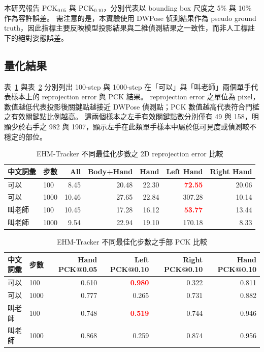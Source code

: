 \documentclass[class=NCU_thesis, crop=false]{standalone}
\providecommand{\metricmark}[1]{\textcolor{red}{\textbf{#1}}}
\begin{document}
本研究報告 $\mathrm{PCK}_{0.05}$ 與 $\mathrm{PCK}_{0.10}$，分別代表以 bounding box 尺度之 5\% 與 10\% 作為容許誤差。
需注意的是，本實驗使用 DWPose 偵測結果作為 pseudo ground truth，因此指標主要反映模型投影結果與二維偵測結果之一致性，而非人工標註下的絕對姿態誤差。

\subsection{量化結果}

表~\ref{tab:tracking_step_reprojection} 與表~\ref{tab:tracking_step_pck} 分別列出 100-step 與 1000-step 在「可以」與「叫老師」兩個單手代表樣本上的 reprojection error 與 PCK 結果。
reprojection error 之單位為 pixel，數值越低代表投影後關鍵點越接近 DWPose 偵測點；PCK 數值越高代表符合門檻之有效關鍵點比例越高。
這兩個樣本之左手有效關鍵點數分別僅有 49 與 158，明顯少於右手之 982 與 1907，顯示左手在此類單手樣本中屬於低可見度或偵測較不穩定的部位。

\begin{table}[H]
\centering
\caption{EHM-Tracker 不同最佳化步數之 2D reprojection error 比較}
\label{tab:tracking_step_reprojection}
\begin{tabular}{llrrrrr}
\toprule
中文詞彙 & 步數 & All & Body+Hand & Hand & Left Hand & Right Hand \\
\midrule
可以 & 100  & 8.45 & 20.48 & 22.30 & \metricmark{72.55} & 20.06 \\
可以 & 1000 & 10.46 & 27.65 & 22.84 & 307.28 & 10.14 \\
叫老師 & 100  & 10.45 & 17.28 & 16.12 & \metricmark{53.77} & 13.44 \\
叫老師 & 1000 & 9.54 & 22.94 & 19.10 & 170.18 & 8.33 \\
\bottomrule
\end{tabular}
\end{table}

\begin{table}[H]
\centering
\caption{EHM-Tracker 不同最佳化步數之手部 PCK 比較}
\label{tab:tracking_step_pck}
\begin{tabular}{llrrrr}
\toprule
中文詞彙 & 步數 & Hand PCK@0.05 & Left PCK@0.10 & Right PCK@0.10 & Hand PCK@0.10 \\
\midrule
可以 & 100  & 0.610 & \metricmark{0.980} & 0.322 & 0.811 \\
可以 & 1000 & 0.777 & 0.265 & 0.731 & 0.882 \\
叫老師 & 100  & 0.748 & \metricmark{0.519} & 0.744 & 0.946 \\
叫老師 & 1000 & 0.868 & 0.259 & 0.874 & 0.956 \\
\bottomrule
\end{tabular}
\end{table}
\end{document}
